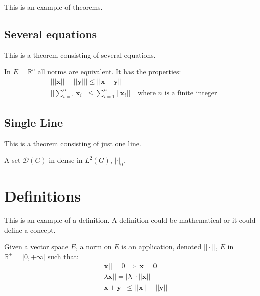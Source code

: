 \documentclass[11pt,fleqn,a5paper]{book} %
\begin{document}
    This is an example of theorems.
    
    \subsection{Several equations}
    This is a theorem consisting of several equations.
    
    \begin{theorem}
    In $E=\mathbb{R}^n$ all norms are equivalent. It has the properties:
    \begin{align}
    & \big| ||\mathbf{x}|| - ||\mathbf{y}|| \big|\leq || \mathbf{x}- \mathbf{y}||\\
    &  ||\sum_{i=1}^n\mathbf{x}_i||\leq \sum_{i=1}^n||\mathbf{x}_i||\quad\text{where $n$ is a finite integer}
    \end{align}
    \end{theorem}
    
    \subsection{Single Line}
    This is a theorem consisting of just one line.
    
    \begin{theorem}
    A set $\mathcal{D}(G)$ in dense in $L^2(G)$, $|\cdot|_0$. 
    \end{theorem}
    
    
    \section{Definitions}
    
    This is an example of a definition. A definition could be mathematical or it could define a concept.
    
    \begin{definition}
    Given a vector space $E$, a norm on $E$ is an application, denoted $||\cdot||$, $E$ in $\mathbb{R}^+=[0,+\infty[$ such that:
    \begin{align}
    & ||\mathbf{x}||=0\ \Rightarrow\ \mathbf{x}=\mathbf{0}\\
    & ||\lambda \mathbf{x}||=|\lambda|\cdot ||\mathbf{x}||\\
    & ||\mathbf{x}+\mathbf{y}||\leq ||\mathbf{x}||+||\mathbf{y}||
    \end{align}
    \end{definition}
    
\end{document}
